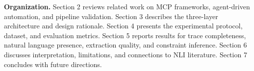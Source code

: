 \textbf{Organization.} Section 2 reviews related work on MCP frameworks, agent-driven automation, and pipeline validation. Section 3 describes the three-layer architecture and design rationale. Section 4 presents the experimental protocol, dataset, and evaluation metrics. Section 5 reports results for trace completeness, natural language presence, extraction quality, and constraint inference. Section 6 discusses interpretation, limitations, and connections to NLI literature. Section 7 concludes with future directions.
